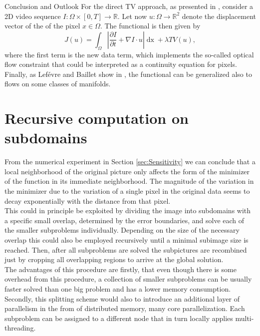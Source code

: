 \begin{chapter}{Conclusion and Outlook}
For the direct TV approach, as presented in \cite{SceneFlow}, consider a 2D video sequence $I:\Omega\times [0,T]\to\mathbb{R}$.
Let now $u:\Omega\to\mathbb{R}^2$ denote the displacement vector of the of the pixel $x\in\Omega$. The functional is then given by
\begin{equation}
    J(u)=\int_{\Omega}\left\vert\frac{\partial I}{\partial t}+\nabla I\cdot u\right\vert\mathop{dx}+\lambda TV(u),
\end{equation}
where the first term is the new data term, which implements the so-called optical flow constraint that could be interpreted as a continuity equation for pixels.
Finally, as Lef\'{e}vre and Baillet show in \cite{manifoldFlow}, the functional can be generalized also to flows on some classes of manifolds.


\section{Recursive computation on subdomains} %
\label{sec:Recursivecomputationonsubdomains}
From the numerical experiment in Section \ref{sec:Sensitivity} we can conclude that a local neighborhood of the original picture only affects the form of the minimizer of the function
in its immediate neighborhood. The magnitude of the variation in the minimizer due to the variation of a single pixel in the original data seems to decay exponentially with the
distance from that pixel. \\

This could in principle be exploited by dividing the image into subdomains with a specific small overlap, determined by the error boundaries, and solve each of the smaller 
subproblems individually. Depending on the size of the necessary overlap this could also be employed recursively until a minimal subimage size is reached. Then, after all subproblems
are solved the subpictures are recombined just by cropping all overlapping regions to arrive at the global solution.\\

The advantages of this procedure are firstly, that even though there is some overhead from this procedure, a collection of smaller subproblems can be usually faster solved than one big
problem and has a lower memory consumption. Secondly, this splitting scheme would also to introduce an additional layer of parallelism in the from of distributed memory, many core
parallelization. Each subproblem can be assigned to a different node that in turn locally applies multi-threading.

\end{chapter}
